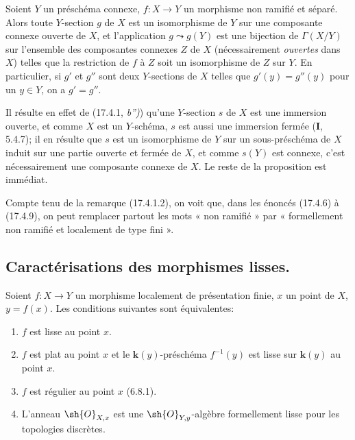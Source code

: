 \begin{proposition}[17.4.9]
\label{IV.17.4.9}
Soient $Y$ un préschéma connexe, $f:X\to Y$ un morphisme non ramifié et séparé. Alors toute $Y$-section $g$ de $X$ est un isomorphisme de $Y$ sur une composante connexe ouverte de $X$, et l'application $g\leadsto g(Y)$ est une bijection de $\Gamma(X/Y)$ sur l'ensemble des composantes connexes $Z$ de $X$ \textup{(nécessairement \emph{ouvertes} dans $X$)} telles que la restriction de $f$ à $Z$ soit un isomorphisme de $Z$ sur $Y$. En particulier, si $g'$ et $g''$ sont deux $Y$-sections de $X$ telles que $g'(y)=g''(y)$ pour un $y\in Y$, on a $g'=g''$.
\end{proposition}

Il résulte en effet de (17.4.1, \emph{b'')}) qu'une $Y$-section $s$ de $X$ est une immersion ouverte, et comme $X$ est un $Y$-schéma, $s$ est aussi une immersion fermée (\textbf{I}, 5.4.7); il en résulte que $s$ est un isomorphisme de $Y$ sur un sous-préschéma de $X$ induit sur une partie ouverte et fermée de $X$, et comme $s(Y)$ est connexe, c'est nécessairement une composante connexe de $X$. Le reste de la proposition est immédiat.

\begin{remark}[17.4.10]
\label{IV.17.4.10}
Compte tenu de la remarque (17.4.1.2), on voit que, dans les énoncés (17.4.6) à (17.4.9), on peut remplacer partout les mots « non ramifié » par « formellement non ramifié et localement de type fini ».
\end{remark}

\subsection{Caractérisations des morphismes lisses.}

\begin{theorem}[17.5.1]
\label{IV.17.5.1}
Soient $f:X\to Y$ un morphisme localement de présentation finie, $x$ un point de $X$, $y=f(x)$. Les conditions suivantes sont équivalentes:
\begin{enumerate}
  \item[\textup{a)}] $f$ est lisse au point $x$.
  \item[\textup{b)}] $f$ est plat au point $x$ et le $\boldsymbol{k}(y)$-préschéma $f^{-1}(y)$ est lisse sur $\boldsymbol{k}(y)$ au point $x$.
  \item[\textup{b$'$)}] $f$ est régulier au point $x$ \textup{(6.8.1)}.
  \item[\textup{c)}] L'anneau $\sh{O}_{X,x}$ est une $\sh{O}_{Y,y}$-algèbre formellement lisse pour les topologies discrètes.
\end{enumerate}
\end{theorem}

